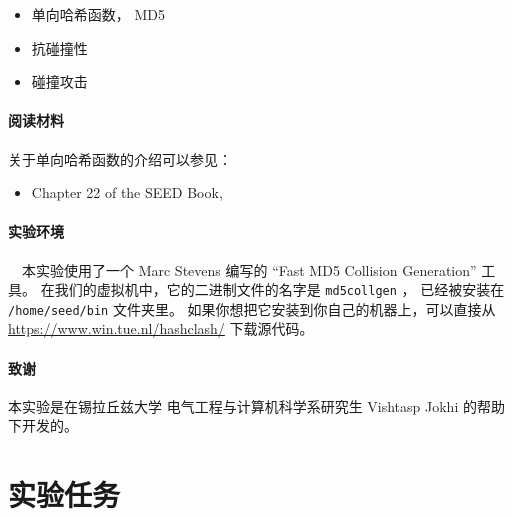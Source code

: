 \begin{itemize}[noitemsep]
\item 单向哈希函数， MD5
\item 抗碰撞性
\item 碰撞攻击
\end{itemize}


\paragraph{阅读材料}
关于单向哈希函数的介绍可以参见：

\begin{itemize}
\item Chapter 22 of the SEED Book, \seedbook
\end{itemize}



\paragraph{实验环境} \seedenvironmentB \ \
本实验使用了一个 Marc Stevens 编写的 ``Fast MD5 Collision Generation'' 工具。
在我们的虚拟机中，它的二进制文件的名字是 \texttt{md5collgen} ，
已经被安装在 \texttt{/home/seed/bin} 文件夹里。
如果你想把它安装到你自己的机器上，可以直接从 \url{https://www.win.tue.nl/hashclash/}
下载源代码。



\paragraph{致谢} 本实验是在锡拉丘兹大学
电气工程与计算机科学系研究生 Vishtasp Jokhi 的帮助下开发的。



\section{实验任务}


